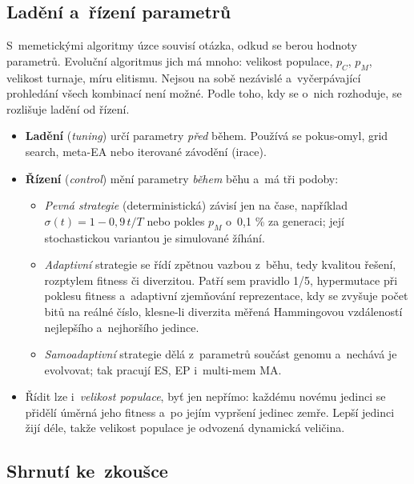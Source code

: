 \documentclass[11pt,a4paper]{article}
\theoremstyle{definition}
\begin{document}
\subsection{Ladění a~řízení parametrů}

S~memetickými algoritmy úzce souvisí otázka, odkud se berou hodnoty parametrů. Evoluční
algoritmus jich má mnoho: velikost populace, $p_C$, $p_M$, velikost turnaje, míru
elitismu. Nejsou na sobě nezávislé a~vyčerpávající prohledání všech kombinací není možné.
Podle toho, kdy se o~nich rozhoduje, se rozlišuje ladění od řízení.
\begin{itemize}
\item \textbf{Ladění} (\emph{tuning}) určí parametry \emph{před} během. Používá se
  pokus-omyl, grid search, meta-EA nebo iterované závodění (irace).
\item \textbf{Řízení} (\emph{control}) mění parametry \emph{během} běhu a~má tři podoby:
  \begin{itemize}
  \item \emph{Pevná strategie} (deterministická) závisí jen na čase, například
    $\sigma(t) = 1 - 0{,}9\,t/T$ nebo pokles $p_M$ o~0{,}1 \% za generaci; její
    stochastickou variantou je simulované žíhání.
  \item \emph{Adaptivní} strategie se řídí zpětnou vazbou z~běhu, tedy kvalitou řešení,
    rozptylem fitness či diverzitou. Patří sem pravidlo 1/5, hypermutace při poklesu
    fitness a~adaptivní zjemňování reprezentace, kdy se zvyšuje počet bitů na reálné
    číslo, klesne-li diverzita měřená Hammingovou vzdáleností nejlepšího a~nejhoršího
    jedince.
  \item \emph{Samoadaptivní} strategie dělá z~parametrů součást genomu a~nechává je
    evolvovat; tak pracují ES, EP i~multi-mem MA.
  \end{itemize}
\item Řídit lze i~\emph{velikost populace}, byť jen nepřímo: každému novému jedinci se
  přidělí  úměrná jeho fitness a~po jejím vypršení jedinec zemře. Lepší
  jedinci žijí déle, takže velikost populace je odvozená dynamická veličina.
\end{itemize}

\subsection{Shrnutí ke~zkoušce}
\end{document}
